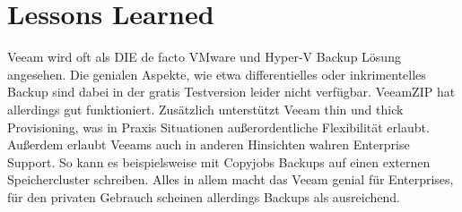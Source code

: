 \hypertarget{lessons-learned}{%
\section{Lessons Learned}\label{lessons-learned}}

Veeam wird oft als DIE de facto VMware und Hyper-V Backup Lösung
angesehen. Die genialen Aspekte, wie etwa differentielles oder
inkrimentelles Backup sind dabei in der gratis Testversion leider nicht
verfügbar. VeeamZIP hat allerdings gut funktioniert. Zusätzlich
unterstützt Veeam thin und thick Provisioning, was in Praxis Situationen
außerordentliche Flexibilität erlaubt. Außerdem erlaubt Veeams auch in
anderen Hinsichten wahren Enterprise Support. So kann es beispielsweise
mit Copyjobs Backups auf einen externen Speichercluster schreiben. Alles
in allem macht das Veeam genial für Enterprises, für den privaten
Gebrauch scheinen allerdings Backups als ausreichend.
